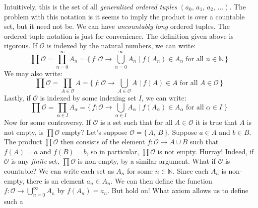 \documentclass{article}
\theoremstyle{plain}
\theoremstyle{normal}
\begin{document}
        Intuitively, this is the set of all \textit{generalized ordered tuples}
        $(a_{0},\,a_{1},\,a_{2},\,\dots)$. The problem with this notation is
        it seems to imply the product is over a countable set, but it need not
        be. We can have \textit{uncountably long} ordered tuples. The ordered
        tuple notation is just for convenience. The definition given above is
        rigorous. If $\mathcal{O}$ is indexed by the natural numbers, we can
        write:
        \begin{equation}
            \prod\mathcal{O}=\prod_{n=0}^{\infty}A_{n}
                =\{\,f:\mathcal{O}\rightarrow\bigcup_{n=0}^{\infty}A_{n}\;|\;
                    f(A_{n})\in{A}_{n}\textrm{ for all }n\in\mathbb{N}\,\}
        \end{equation}
        We may also write:
        \begin{equation}
            \prod\mathcal{O}=\prod_{A\in\mathcal{O}}A=
                \{\,f:\mathcal{O}\rightarrow\bigcup_{A\in\mathcal{O}}A\;|\;
                    f(A)\in{A}\textrm{ for all }A\in\mathcal{O}\,\}
        \end{equation}
        Lastly, if $\mathcal{O}$ is indexed by some indexing set $I$, we can
        write:
        \begin{equation}
            \prod\mathcal{O}=\prod_{\alpha\in{I}}A_{\alpha}=
                \{\,f:\mathcal{O}\rightarrow\bigcup_{\alpha\in{I}}A_{\alpha}
                    \;|\;f(A_{\alpha})\in{A}_{\alpha}\textrm{ for all }
                        \alpha\in{I}\;\}
        \end{equation}
        Now for some controversy. If $\mathcal{O}$ is a set such that for
        all $A\in\mathcal{O}$ it is true that $A$ is not empty, is
        $\prod\mathcal{O}$ empty? Let's suppose $\mathcal{O}=\{\,A,\,B\,\}$.
        Suppose $a\in{A}$ and $b\in{B}$. The product $\prod\mathcal{O}$
        then consists of the element
        $f:\mathcal{O}\rightarrow{A}\cup{B}$ such that
        $f(A)=a$ and $f(B)=b$, so in particular,
        $\prod\mathcal{O}$ is not empty. Hurray! Indeed, if $\mathcal{O}$ is any
        \textit{finite} set, $\prod\mathcal{O}$ is non-empty, by a similar
        argument. What if $\mathcal{O}$ is countable? We can write each set as
        $A_{n}$ for some $n\in\mathbb{N}$. Since each $A_{n}$ is non-empty,
        there is an element $a_{n}\in{A}_{n}$. We can then define the function
        $f:\mathcal{O}\rightarrow\bigcup_{n=0}^{\infty}A_{n}$ by
        $f(A_{n})=a_{n}$. But hold on! What axiom allows us to define such a
\end{document}
